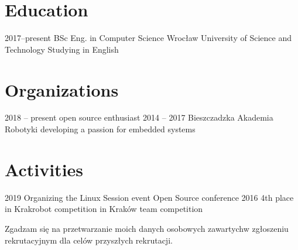 \documentclass[]{cv-style}
\begin{document}

\section{Education}

\begin{entrylist}
\entry
{2017--present\quad }
{ BSc Eng. {\normalfont  in Computer Science}}
{Wrocław University of Science and Technology}
{ Studying in English}
{\vspace{0.3cm}}
\end{entrylist}


\section{Organizations}

\begin{entrylist}
\entry
{2018 -- present}
{}
{open source enthusiast}
{\vspace{0.1cm}}
\entry
{2014 -- 2017}
{\quad Bieszczadzka Akademia Robotyki}
{developing a passion for embedded systems}
{\vspace{0.1cm}}

\end{entrylist}


\section{Activities}

\begin{entrylist}
\entry
{2019}
{Organizing the Linux Session event}
{Open Source conference}
{}
\entry
{2016}
{4th place in Krakrobot competition in Kraków}
{team competition}


\end{entrylist}


\vspace{1cm}


{\footnotesize Zgadzam się na przetwarzanie moich danych osobowych zawartych\newline w  zgłoszeniu rekrutacyjnym dla celów przyszłych rekrutacji.}
\end{document}
